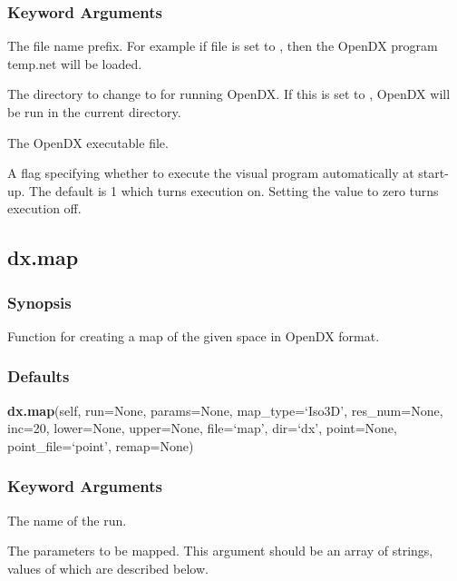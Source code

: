 \subsubsection{Keyword Arguments}

  The file name prefix.  For example if file is set to , then the OpenDX program temp.net will be loaded. 

  The directory to change to for running OpenDX.  If this is set to , OpenDX will be run in the current directory. 

  The OpenDX executable file. 

  A flag specifying whether to execute the visual program automatically at start-up.  The default is 1 which turns execution on.  Setting the value to zero turns execution off. 





\newpage

\subsection{dx.map}


\subsubsection{Synopsis}

Function for creating a map of the given space in OpenDX format.



\subsubsection{Defaults}

\textsf{\textbf{dx.map}(self, run=None, params=None, map\_type=`Iso3D', res\_num=None, inc=20, lower=None, upper=None, file=`map', dir=`dx', point=None, point\_file=`point', remap=None)}


\subsubsection{Keyword Arguments}

  The name of the run. 

  The parameters to be mapped.  This argument should be an array of strings, values of which are described below. 

